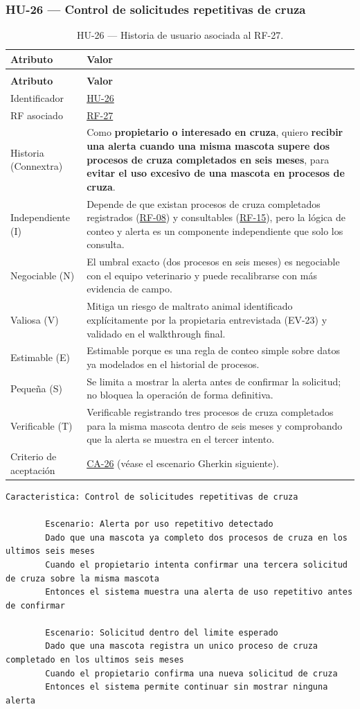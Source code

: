 \documentclass[journal,onecolumn]{IEEEtran}
\makeatletter
\newenvironment{atributos}[2]{%
	\small
	\begin{longtable}{@{}>{\raggedright\arraybackslash}p{4.2cm} >{\raggedright\arraybackslash}p{11.2cm}@{}}
		\caption{#2}\label{tab:#1}\\
		\toprule
		\textbf{Atributo} & \textbf{Valor} \\
		\midrule
		\endfirsthead
		\multicolumn{2}{@{}l}{\small\itshape (continuación)}\\
		\toprule
		\textbf{Atributo} & \textbf{Valor} \\
		\midrule
		\endhead
		\bottomrule
		\endlastfoot
	}{%
	\end{longtable}
	\normalsize
}
\makeatother
\begin{document}
	\subsubsection{HU-26 --- Control de solicitudes repetitivas de cruza}
	
	\begin{atributos}{HU-26}{HU-26 --- Historia de usuario asociada al RF-27.}
		Identificador & \hyperref[tab:HU-26]{HU-26} \\
		RF asociado & \hyperref[tab:RF-27]{RF-27} \\
		Historia (Connextra) & Como \textbf{propietario o interesado en cruza}, quiero \textbf{recibir una alerta cuando una misma mascota supere dos procesos de cruza completados en seis meses}, para \textbf{evitar el uso excesivo de una mascota en procesos de cruza}. \\
		Independiente (I) & Depende de que existan procesos de cruza completados registrados (\hyperref[tab:RF-08]{RF-08}) y consultables (\hyperref[tab:RF-15]{RF-15}), pero la lógica de conteo y alerta es un componente independiente que solo los consulta. \\
		Negociable (N) & El umbral exacto (dos procesos en seis meses) es negociable con el equipo veterinario y puede recalibrarse con más evidencia de campo. \\
		Valiosa (V) & Mitiga un riesgo de maltrato animal identificado explícitamente por la propietaria entrevistada (EV-23) y validado en el walkthrough final. \\
		Estimable (E) & Estimable porque es una regla de conteo simple sobre datos ya modelados en el historial de procesos. \\
		Pequeña (S) & Se limita a mostrar la alerta antes de confirmar la solicitud; no bloquea la operación de forma definitiva. \\
		Verificable (T) & Verificable registrando tres procesos de cruza completados para la misma mascota dentro de seis meses y comprobando que la alerta se muestra en el tercer intento. \\
		Criterio de aceptación & \hyperref[lst:ca26]{CA-26} (véase el escenario Gherkin siguiente). \\
	\end{atributos}
	
	\begin{lstlisting}[style=gherkin,caption={CA-26 --- Escenario de aceptación de la historia HU-26.},label={lst:ca26}]
		Caracteristica: Control de solicitudes repetitivas de cruza
		
		Escenario: Alerta por uso repetitivo detectado
		Dado que una mascota ya completo dos procesos de cruza en los ultimos seis meses
		Cuando el propietario intenta confirmar una tercera solicitud de cruza sobre la misma mascota
		Entonces el sistema muestra una alerta de uso repetitivo antes de confirmar
		
		Escenario: Solicitud dentro del limite esperado
		Dado que una mascota registra un unico proceso de cruza completado en los ultimos seis meses
		Cuando el propietario confirma una nueva solicitud de cruza
		Entonces el sistema permite continuar sin mostrar ninguna alerta
	\end{lstlisting}
\end{document}
